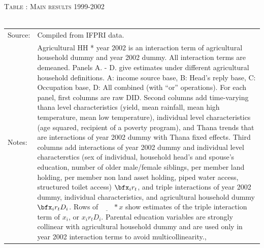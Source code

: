 \begin{table}\hfil\textsc{\footnotesize Table \thetable: Main results 1999-2002\label{zEm.1999.10.sameN}}\\\setlength{\tabcolsep}{.5pt}\renewcommand{\arraystretch}{.675}\hspace{-2em}\hfil\\\renewcommand{\arraystretch}{1}\hfil\begin{tabular}{>{\hfill\scriptsize}p{1cm}<{}>{\scriptsize}p{12cm}<{\hfill}} Source:& Compiled from IFPRI data. \\[-1ex] Notes:&   \textsf{Agricultural HH * year 2002} is an interaction term of agricultural household dummy and year 2002 dummy. All interaction terms are demeaned. Panels A. - D. give estimates under different agricultural household definitions. A: income source base, B: Head's reply base, C: Occupation base, D: All combined (with ``or'' operations). For each panel, first columns are raw DID. Second columns add time-varying thana level characteristics (yield, mean rainfall, mean high temperature, mean low temperature), individual level characteristics (age squared, recipient of a poverty program), and \textsf{Thana trends} that are interactions of year 2002 dummy with Thana fixed effects. Third columns add interactions of year 2002 dummy and individual level characterstics (sex of individual, household head's and spouse's education, number of older male/female siblings, per member land holding, per member non land asset holding, piped water access, structured toilet access) $\bfx_{i}r_{t}$, and triple interactions of year 2002 dummy, individual characteristics, and agricultural household dummy $\bfx_{i}r_{t}D_{i}$. Rows of $\underline{\phantom{mm}}*x$ show estimates of the triple interaction term of $x_{i}$, or $x_{i}r_{t}D_{i}$. Parental education variables are strongly collinear with agricultural household dummy and are used only in year 2002 interaction terms to avoid multicollinearity., \\   \end{tabular} \end{table}

